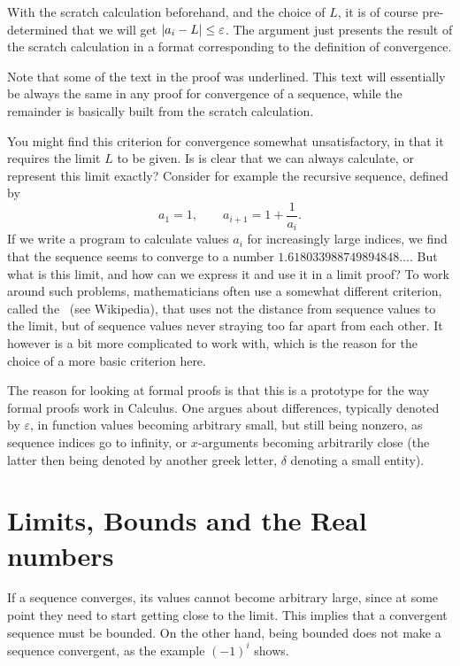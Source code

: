 With the scratch calculation beforehand, and the choice of $L$, it is of
course pre-determined that we will get $\left|a_i-L\right|\le\varepsilon$. The
argument just presents the result of the scratch calculation in a format
corresponding to the definition of convergence.

Note that some of the text in the proof was underlined. This text will
essentially be always the same in any proof for convergence of a sequence,
while the remainder is basically built from the scratch calculation.

\begin{note}
\label{cauchycrit}
You might find this criterion for convergence somewhat unsatisfactory, in
that it requires the limit $L$ to be given. Is is clear that we can always
calculate, or represent this limit exactly? Consider for example the
recursive sequence, defined by
\[
a_1=1,\qquad a_{i+1}=1+\frac{1}{a_i}.
\]
If we write a program to calculate values $a_i$ for increasingly large
indices, we find that the sequence seems to converge to a number
$1.618033988749894848\ldots$. But what is this limit, and how can we express it and use it in a limit proof?  To work
around such problems, mathematicians often use a somewhat different
criterion, called the~ (see Wikipedia), that uses
not the distance from sequence values to the limit, but of sequence values
never straying too far apart from each other. It however is a bit more
complicated to work with, which is the reason for the choice of a more basic
criterion here.
\end{note}

The reason for looking at formal proofs is that this is a prototype for the
way formal proofs work in Calculus. One argues about differences, typically denoted
by $\varepsilon$, in function values becoming arbitrary small, but still
being nonzero, as sequence indices go to infinity, or $x$-arguments becoming
arbitrarily close (the latter then being denoted by another greek letter, 
$\delta$ denoting a small entity).

\section{Limits, Bounds and the Real numbers}

If a sequence converges, its values cannot become arbitrary large, since at some point
they need to start getting close to the limit. This implies that a convergent sequence
must be bounded.
On the other hand, being bounded does not make a sequence
convergent, as the example $(-1)^i$ shows.

